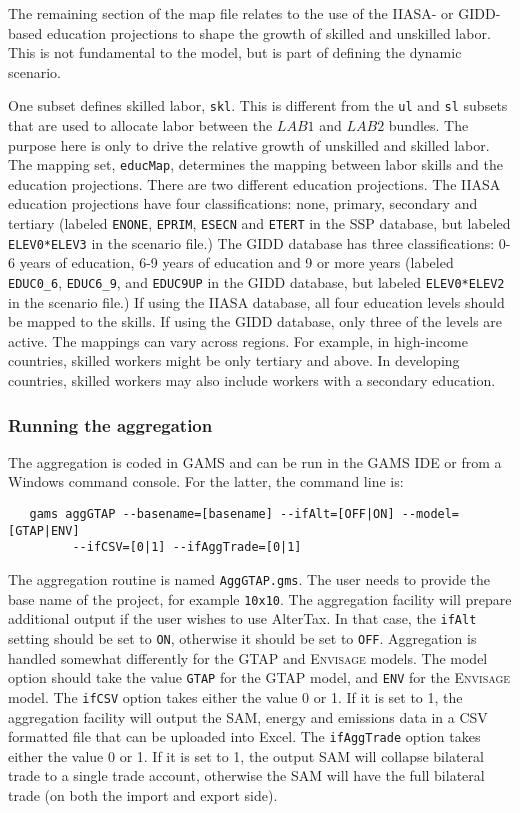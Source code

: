 The remaining section of the map file relates to the use of the IIASA- or
GIDD-based education projections to shape the growth of skilled and unskilled
labor. This is not fundamental to the model, but is part of defining the dynamic
scenario.

One subset defines skilled labor, \texttt{skl}. This is different from the
\texttt{ul} and \texttt{sl} subsets that are used to allocate labor between the
$\mathit{LAB1}$ and $\mathit{LAB2}$ bundles. The purpose here is only to drive
the relative growth of unskilled and skilled labor. The mapping set,
\texttt{educMap}, determines the mapping between labor skills and the education
projections. There are two different education projections. The IIASA education
projections have four classifications: none, primary, secondary and tertiary
(labeled \texttt{ENONE}, \texttt{EPRIM}, \texttt{ESECN} and \texttt{ETERT} in
the SSP database, but labeled \texttt{ELEV0*ELEV3} in the scenario file.) The
GIDD database has three classifications: 0-6 years of education, 6-9 years of
education and 9 or more years (labeled \texttt{EDUC0\_6}, \texttt{EDUC6\_9}, and
\texttt{EDUC9UP} in the GIDD database, but labeled \texttt{ELEV0*ELEV2} in the
scenario file.) If using the IIASA database, all four education levels should be
mapped to the skills. If using the GIDD database, only three of the levels are
active. The mappings can vary across regions. For example, in high-income
countries, skilled workers might be only tertiary and above. In developing
countries, skilled workers may also include workers with a secondary education.

\subsubsection{Running the aggregation}

The aggregation is coded in GAMS and can be run in the GAMS IDE or from a
Windows command console. For the latter, the command line is:

\begin{verbatim}
   gams aggGTAP --basename=[basename] --ifAlt=[OFF|ON] --model=[GTAP|ENV]
         --ifCSV=[0|1] --ifAggTrade=[0|1]
\end{verbatim}

\noindent The aggregation routine is named \texttt{AggGTAP.gms}. The user needs
to provide the base name of the project, for example \texttt{10x10}. The
aggregation facility will prepare additional output if the user wishes to use
AlterTax. In that case, the \texttt{ifAlt} setting should be set to \texttt{ON},
otherwise it should be set to \texttt{OFF}. Aggregation is handled somewhat
differently for the GTAP and \textsc{Envisage} models. The model option should
take the value \texttt{GTAP} for the GTAP model, and \texttt{ENV} for the
\textsc{Envisage} model. The \texttt{ifCSV} option takes either the value 0 or
1. If it is set to 1, the aggregation facility will output the SAM, energy and
emissions data in a CSV formatted file that can be uploaded into Excel. The
\texttt{ifAggTrade} option takes either the value 0 or 1. If it is set to 1, the
output SAM will collapse bilateral trade to a single trade account, otherwise
the SAM will have the full bilateral trade (on both the import and export side).

